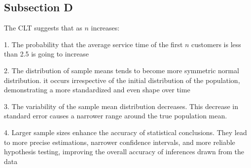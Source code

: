 \documentclass[a4paper,11pt]{article}
\theoremstyle{mytheor}
\begin{document}
\newpage
\subsection{Subsection D}
The CLT suggests that as $n$ increases:

1. The probability that the average service time of the first $n$ customers is less than 2.5 is going to increase

2. The distribution of sample means tends to become more symmetric normal distribution. it occurs irrespective of the initial distribution of the population, demonstrating a more standardized and even shape over time

3. The variability of the sample mean distribution decreases. This decrease in standard error causes a narrower range around the true population mean.

4. Larger sample sizes enhance the accuracy of statistical conclusions. They lead to more precise estimations, narrower confidence intervals, and more reliable hypothesis testing, improving the overall accuracy of inferences drawn from the data
\end{document}
